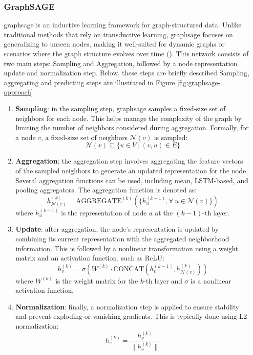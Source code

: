 \subsubsection*{GraphSAGE}

\gls{graphsage} is an inductive learning framework for graph-structured data.
Unlike traditional methods that rely on transductive learning, \gls{graphsage} focuses on generalizing to unseen nodes, making it well-suited for dynamic graphs or scenarios where the graph structure evolves over time (\cite{Hamilton2017}).
This network consists of two main steps: Sampling and Aggregation, followed by a node representation update and normalization step.
Below, these steps are briefly described
Sampling, aggregating and predicting steps are illustrated in Figure \ref{fig:graphsage-approach}.


\begin{enumerate}
    \item \textbf{Sampling}: in the sampling step, \gls{graphsage} samples a fixed-size set of neighbors for each node. This helps manage the complexity of the graph by limiting the number of neighbors considered during aggregation. Formally, for a node \(v\), a fixed-size set of neighbors \(\mathcal{N}(v)\) is sampled:
    \[
    \mathcal{N}(v) \subseteq \{u \in V~|~(v, u) \in E\}
    \]
 
    \item \textbf{Aggregation}: the aggregation step involves aggregating the feature vectors of the sampled neighbors to generate an updated representation for the node. Several aggregation functions can be used, including mean, LSTM-based, and pooling aggregators. The aggregation function is denoted as:
    \[
    h_{\mathcal{N}(v)}^{(k)} = \text{AGGREGATE}^{(k)}(\{h_u^{(k-1)}, \forall~u \in \mathcal{N}(v)\})
    \]
    where \(h_u^{(k-1)}\) is the representation of node \(u\) at the \((k-1)\)-th layer.
 
    \item \textbf{Update}: after aggregation, the node's representation is updated by combining its current representation with the aggregated neighborhood information. This is followed by a nonlinear transformation using a weight matrix and an activation function, such as ReLU:
    \[
    h_v^{(k)} = \sigma\left(W^{(k)} \cdot \text{CONCAT}(h_v^{(k-1)}, h_{\mathcal{N}(v)}^{(k)})\right)
    \]
    where \(W^{(k)}\) is the weight matrix for the \(k\)-th layer and \(\sigma\) is a nonlinear activation function.
 
    \item \textbf{Normalization}: finally, a normalization step is applied to ensure stability and prevent exploding or vanishing gradients. This is typically done using L2 normalization:
    \[
    h_v^{(k)} = \frac{h_v^{(k)}}{\|h_v^{(k)}\|}
    \]
\end{enumerate}

